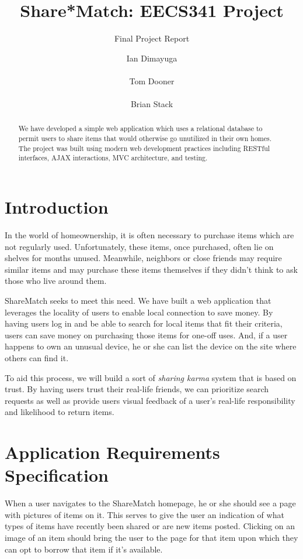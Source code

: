 \documentclass{acm_proc_article-sp}
\begin{document}
\title{Share*Match: EECS341 Project}
\subtitle{Final Project Report}
\author{
\alignauthor Ian Dimayuga \\
    \\
\alignauthor Tom Dooner \\
    \\
\alignauthor Brian Stack \\
}
\maketitle
\begin{abstract}
We have developed a simple web application which uses a relational database to permit users to share items that would otherwise go unutilized in their own homes.  The project was built using modern web development practices including RESTful interfaces, AJAX interactions, MVC architecture, and testing. 
\end{abstract}

\section{Introduction}
In the world of homeownership, it is often necessary to purchase items which are not regularly used. 
Unfortunately, these items, once purchased, often lie on shelves for months unused. 
Meanwhile, neighbors or close friends may require similar items and may purchase these items themselves if they didn't think to ask those who live around them.

ShareMatch seeks to meet this need. We have built a web application that leverages the locality of users to 
enable local connection to save money. By having users log in and be able to search for local items that fit 
their criteria, users can save money on purchasing those items for one-off uses. And, if a user happens to own 
an unusual device, he or she can list the device on the site where others can find it.

To aid this process, we will build a sort of \textit{sharing karma} system that is based on trust. 
By having users trust their real-life friends, we can prioritize search requests as well as provide 
users visual feedback of a user's real-life responsibility and likelihood to return items.

\section{Application Requirements Specification}
When a user navigates to the ShareMatch homepage, he or she should see a page with pictures of items on it.
This serves to give the user an indication of what types of items have recently been shared or are new items posted. 
Clicking on an image of an item should bring the user to the page for that item upon which they can opt to borrow that item if it's available.
\end{document}
